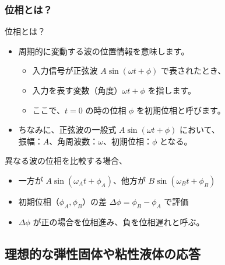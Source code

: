 \documentclass[12pt, dvipdfmx]{beamer}
\begin{document}
\begin{frame}
	\frametitle{位相とは？}
		\begin{block}{位相とは？}
			\begin{itemize}
				\item 周期的に変動する波の位置情報を意味します。
				\begin{itemize}
					\item 入力信号が正弦波 $A \sin (\omega t + \phi)$ で表されたとき、
					\item 入力を表す変数（角度）$\omega t + \phi$ を指します。
					\item ここで、$t=0$ の時の位相 $\phi$ を初期位相と呼びます。
				\end{itemize}
				\item ちなみに、正弦波の一般式 $A \sin (\omega t + \phi)$ において、\\
				振幅：$A$、角周波数：$\omega$、初期位相：$\phi$ となる。
			\end{itemize}
		\end{block}

		\begin{alertblock}{異なる波の位相を比較する場合、}
			\begin{itemize}
				\item 一方が $A \sin (\omega_A t + \phi_A)$、他方が $B \sin (\omega_B t + \phi_B)$  
				\item 初期位相（$\phi_A, \phi_B$）の差 $\Delta \phi = \phi_B - \phi_A$ で評価
				\item $\Delta \phi$ が正の場合を位相進み、負を位相遅れと呼ぶ。
			\end{itemize}
		\end{alertblock}
\end{frame}

\subsection{理想的な弾性固体や粘性液体の応答}
\end{document}
